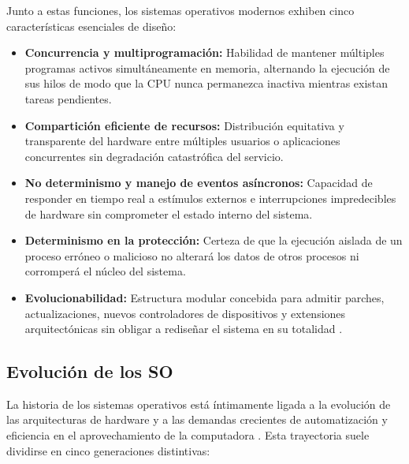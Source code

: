\documentclass[12pt]{article}
\begin{document}
Junto a estas funciones, los sistemas operativos modernos exhiben cinco características esenciales de diseño:
\begin{itemize}[leftmargin=*]
    \item \textbf{Concurrencia y multiprogramación:} Habilidad de mantener múltiples programas activos simultáneamente en memoria, alternando la ejecución de sus hilos de modo que la CPU nunca permanezca inactiva mientras existan tareas pendientes.
    \item \textbf{Compartición eficiente de recursos:} Distribución equitativa y transparente del hardware entre múltiples usuarios o aplicaciones concurrentes sin degradación catastrófica del servicio.
    \item \textbf{No determinismo y manejo de eventos asíncronos:} Capacidad de responder en tiempo real a estímulos externos e interrupciones impredecibles de hardware sin comprometer el estado interno del sistema.
    \item \textbf{Determinismo en la protección:} Certeza de que la ejecución aislada de un proceso erróneo o malicioso no alterará los datos de otros procesos ni corromperá el núcleo del sistema.
    \item \textbf{Evolucionabilidad:} Estructura modular concebida para admitir parches, actualizaciones, nuevos controladores de dispositivos y extensiones arquitectónicas sin obligar a rediseñar el sistema en su totalidad \parencite[\S 2.1, p.\ 71]{stallings2018operating}.
\end{itemize}

\subsection{Evolución de los SO}\label{sec:evolucionSo}

La historia de los sistemas operativos está íntimamente ligada a la evolución de las arquitecturas de hardware y a las demandas crecientes de automatización y eficiencia en el aprovechamiento de la computadora \parencite[\S 2.13, p.\ 67]{carretero2001sistemas}. Esta trayectoria suele dividirse en cinco generaciones distintivas:
\end{document}
